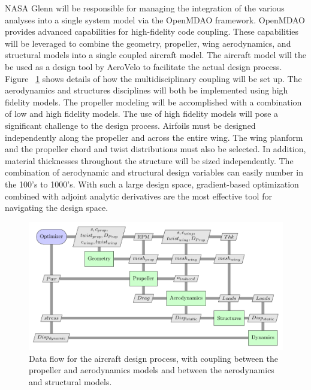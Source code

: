 \documentclass[]{aiaa-tc}
\begin{document}
    NASA Glenn will be responsible for managing the integration of the various analyses into 
    a single system model via the OpenMDAO framework. OpenMDAO provides advanced 
    capabilities for high-fidelity code coupling. These capabilities will be leveraged to combine the geometry,
    propeller, wing aerodynamics, and structural models into a single coupled aircraft model. The aircraft 
    model will the be used as a design tool by AeroVelo to facilitate the actual design process. 
    Figure ~\ref{fig:n2} shows details of how the multidisciplinary coupling will be set up. The aerodynamics 
    and structures disciplines will both be implemented using high fidelity models. The propeller modeling 
    will be accomplished with a combination of low and high fidelity models. The use of high fidelity models 
    will pose a significant challenge to the design process. Airfoils must be designed independently along the propeller and
    across the entire wing. The wing planform and the propeller chord and twist distributions must also be selected.  In addition, material thicknesses throughout the structure
    will be sized independently. The combination of aerodynamic and structural design variables 
    can easily number in the 100's to 1000's. With such a large design space, gradient-based optimization 
    combined with adjoint analytic derivatives are the most effective tool for navigating the design space. 

    \begin{figure} \centering
        \includegraphics[width=.75\textwidth]{xdsm/overall}
        \caption{Data flow for the aircraft design process, with coupling between the propeller and aerodynamics models 
        and between the aerodynamics and structural models. }
        \label{fig:n2}
    \end{figure}
\end{document}

